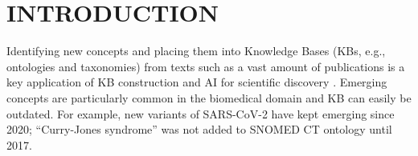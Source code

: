 \documentclass[sigconf]{acmart}
\begin{document}
	
	
	\maketitle
	
	
	\section{INTRODUCTION}
	\label{sec:intro}
	Identifying new concepts and placing them into Knowledge Bases (KBs, e.g., ontologies and taxonomies) from texts such as a vast amount of publications is a key application of KB construction and AI for scientific discovery \cite{hastings2023ai}. Emerging concepts are particularly common in the biomedical domain and KB can easily be outdated. For example, new variants of SARS-CoV-2 have kept emerging since 2020; ``Curry-Jones syndrome'' was not added to SNOMED CT ontology \cite{donnelly2006snomed} until 2017.
	
\end{document}
